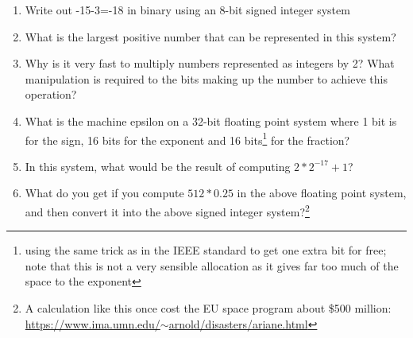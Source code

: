 \documentclass[11pt,a4paper]{article}
\newcommand{\bn}{\begin{enumerate}}
\newcommand{\en}{\end{enumerate}}
\begin{document}
\begin{frame}[fragile,label=current]
\bn
    \item Write out -15-3=-18 in binary using an 8-bit signed integer system
    \item What is the largest positive number that can be represented in this system?
    \item Why is it very fast to multiply numbers represented as integers by 2?  What manipulation is required to the bits making up the number to achieve this operation?
    \item What is the machine epsilon on a 32-bit floating point system where 1 bit is for the sign, 16 bits for the exponent and 16 bits\footnote{using the same trick as in the IEEE standard to get one extra bit for free; note that this is not a very sensible allocation as it gives far too much of the space to the exponent} for the fraction?
    \item In this system, what would be the result of computing $2* 2^{-17} + 1$?
    \item What do you get if you compute $512 * 0.25$ in the above floating point system, and then convert it into the above signed integer system?\footnote{A calculation like this once cost the EU space program about \$500 million: \href{https://www.ima.umn.edu/~arnold/disasters/ariane.html}{https://www.ima.umn.edu/$\sim$arnold/disasters/ariane.html}}
 \en
\end{frame}
\end{document}

